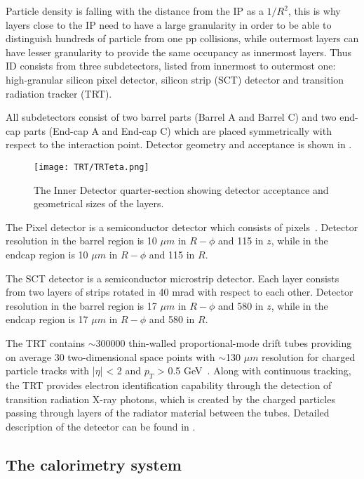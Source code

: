 Particle density is falling with the distance from the IP as a $1/R^2$, this is why layers close to the IP need to have a large granularity in order to be able to distinguish 
hundreds of particle from one pp collisions, while outermost layers can have lesser granularity to provide the same occupancy as innermost layers.
Thus ID consists from three subdetectors, listed from innermost to outermost one: high-granular silicon pixel detector, silicon strip (SCT) detector and transition radiation tracker (TRT).

All subdetectors consist of two barrel parts (Barrel A and Barrel C) and two end-cap parts (End-cap A and End-cap C) 
which are placed symmetrically with respect to the interaction point.
Detector geometry and acceptance is shown in .

\begin{figure}
\centering
\texttt{[image: TRT/TRTeta.png]}
\caption{ 
The Inner Detector quarter-section showing detector acceptance and geometrical sizes of the layers.
}
\label{fig:ID_eta}
\end{figure}


The Pixel detector is a semiconductor detector which consists of pixels~\cite{Wermes:381263}.
Detector resolution in the barrel region is 10 $\mu m$ in $R-\phi$ and 115 in $z$,
while in the endcap region is 10 $\mu m$ in $R-\phi$ and 115 in $R$.

The SCT detector is a semiconductor microstrip detector. Each layer consists from
two layers of strips rotated in 40 mrad with respect to each other.
Detector resolution in the barrel region is 17 $\mu m$ in $R-\phi$ and 580 in $z$,
while in the endcap region is 17 $\mu m$ in $R-\phi$ and 580 in $R$.

The TRT contains $\sim$300000 thin-walled proportional-mode drift tubes providing on average 30 two-dimensional 
space points with $\sim$130 $\mu m$ resolution for charged particle tracks with |$\eta$| < 2 and $p_T$ > 0.5 GeV~\cite{Abat:2008zza,Abat:2008zzb,Abat:2008zz}.
Along with continuous tracking, the TRT provides electron identification capability through the detection of transition radiation X-ray photons, which is created by the charged particles passing through layers of the radiator material between the tubes.
Detailed description of the detector can be found in .




\subsection{The calorimetry system}

